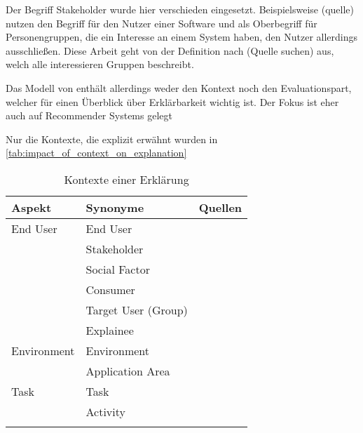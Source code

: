Der Begriff Stakeholder wurde hier verschieden eingesetzt. Beispielsweise (quelle) nutzen den Begriff für den Nutzer einer Software und \cite{nunes_systematic_2017} als Oberbegriff für Personengruppen, die ein Interesse an einem System haben, den Nutzer allerdings ausschließen. Diese Arbeit geht von der Definition nach (Quelle suchen) aus, welch alle interessieren Gruppen beschreibt. 

Das Modell von \cite{nunes_systematic_2017} enthält allerdings weder den Kontext noch den Evaluationspart, welcher für einen Überblick über Erklärbarkeit wichtig ist. Der Fokus ist eher auch auf Recommender Systems gelegt

Nur die Kontexte, die explizit erwähnt wurden in \autoref{tab:impact_of_context_on_explanation}

\begin{longtable}{|p{}|p{}|p{}|}
    \hline
    \textbf{Aspekt} & \textbf{Synonyme} & \textbf{Quellen} \\ \hline
    End User        & End User & \cite{chazette2020explainability} \cite{kaptein_personalised_2017} \cite{sokol_one_2020} \\
                    & Stakeholder & \cite{chazette_knowledge_nodate} \\
                    & Social Factor & \cite{ehsan_human-centered_2020} \\
                    & Consumer & \cite{ehsan_human-centered_2020} \\
                    & Target User (Group) & \cite{chazette2020explainability} \cite{wiegand_id_2020} \\
                    & Explainee & \cite{chazette_knowledge_nodate} \cite{kohl_explainability_2019} \\
    \hline
    Environment     & Environment & \cite{chazette_knowledge_nodate} \cite{wiegand_id_2020} \cite{wiegand2019drive} \\
                    & Application Area & \cite{sokol_explainability_2020} \cite{wiegand2019drive} \cite{wiegand_id_2020} \\
    \hline
    Task            & Task & \cite{chazette_knowledge_nodate} \cite{sokol_explainability_2020} \cite{gunning2019darpa} \\
                    & Activity & \cite{wohlin2012experimentation} \\
                    
    \hline
\caption{Kontexte einer Erklärung}
\label{tab:impact_of_context_on_explanation}
\end{longtable}


